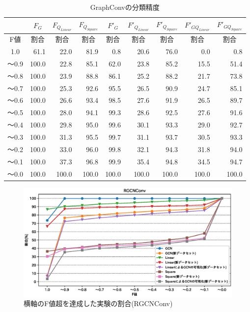 \begin{table}[tb]
\caption{GraphConvの分類精度}\label{tbl:result_graphconv}
\centering
\begin{tabular}{|c|r|r|r|r|r|r|r|r|}\hline
  & \multicolumn{1}{|c|}{$F_{G}$} & \multicolumn{1}{|c|}{$F_{Q_{Linear}}$} & \multicolumn{1}{|c|}{$F_{Q_{Square}}$} & \multicolumn{1}{|c|}{$F'_{G}$} & \multicolumn{1}{|c|}{${F'}_{Q_{Linear}}$} & \multicolumn{1}{|c|}{${F'}_{Q_{Square}}$} & \multicolumn{1}{|c|}{${F'}_{GQ_{Linear}}$} & \multicolumn{1}{|c|}{${F'}_{GQ_{Square}}$}\\
  \hline
  \multicolumn{1}{|c|}{F値} & \multicolumn{1}{|c|}{割合} & \multicolumn{1}{|c|}{割合} & \multicolumn{1}{|c|}{割合} & \multicolumn{1}{|c|}{割合} & \multicolumn{1}{|c|}{割合} & \multicolumn{1}{|c|}{割合} & \multicolumn{1}{|c|}{割合} & \multicolumn{1}{|c|}{割合} \\
  \hline
  1.0   & 61.1 & 22.0 & 81.9 & 0.8 & 20.6 & 76.0 & 0.0 & 0.8 \\
  〜0.9 & 100.0 & 22.8 & 85.1 & 62.0 & 23.8 & 85.2 & 15.5 & 51.4 \\
  〜0.8 & 100.0 & 23.9 & 88.8 & 86.1 & 25.2 & 88.2 & 21.7 & 73.8 \\
  〜0.7 & 100.0 & 25.3 & 92.6 & 95.5 & 26.5 & 90.9 & 24.7 & 85.1 \\
  〜0.6 & 100.0 & 26.6 & 93.4 & 98.5 & 27.6 & 91.9 & 26.5 & 89.7 \\
  〜0.5 & 100.0 & 28.0 & 94.1 & 99.3 & 28.6 & 92.5 & 27.6 & 91.6 \\
  〜0.4 & 100.0 & 29.8 & 95.0 & 99.6 & 30.1 & 93.3 & 29.0 & 92.7 \\
  〜0.3 & 100.0 & 31.3 & 95.5 & 99.7 & 31.1 & 93.7 & 30.5 & 93.3 \\
  〜0.2 & 100.0 & 33.0 & 96.0 & 99.8 & 32.1 & 94.3 & 31.8 & 94.0 \\
  〜0.1 & 100.0 & 37.3 & 96.8 & 99.9 & 35.4 & 94.8 & 34.5 & 94.7 \\
  〜0.0 & 100.0 & 100.0 & 100.0 & 100.0 & 100.0 & 100.0 & 100.0 & 100.0 \\
  \hline
\end{tabular}
\end{table}

\begin{figure}[tb]
  \centering
  \includegraphics[scale=0.7]{fig/fig-exp_RGCNConv.eps}
  \caption{横軸のF値超を達成した実験の割合(RGCNConv)}\label{fig:result_rgcnconv}
\end{figure}

